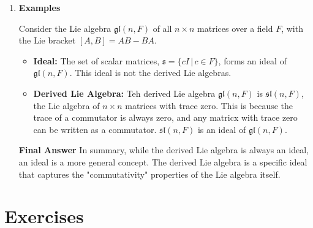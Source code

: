 \documentclass[12pt,a4paper]{report}
\begin{document}
\begin{remark}
\begin{enumerate}[label=Step \arabic*:]
	\item \textbf{Examples}
	
	Consider the Lie algebra $\mathfrak{gl}(n,F)$ of all $n \times n$ matrices over a field $F$, with the Lie bracket $[A,B]=AB-BA$.
	\begin{itemize}
		\item \textbf{Ideal: }The set of scalar matrices, $\mathfrak{s}=\{cI\,|\, c\in F\}$, forms an ideal of $\mathfrak{gl}(n,F)$.  This ideal is not the derived Lie algebras.
		\item \textbf{Derived Lie Algebra:} Teh derived Lie algebra $\mathfrak{gl}(n,F)$ is $\mathfrak{sl}(n,F)$, the Lie algebra of $n\times n$ matrices with trace zero.  This is because the trace of a commutator is always zero, and any matricx with trace zero can be written as a commutator.  $\mathfrak{sl}(n,F)$ is an ideal of $\mathfrak{gl}(n,F)$.
	\end{itemize}
	
	\textbf{Final Answer}  In summary, while the derived Lie algebra is always an ideal, an ideal is a more general concept. The derived Lie algebra is a specific ideal that captures the "commutativity" properties of the Lie algebra itself.

\end{enumerate}

\end{remark}
\section{Exercises}
\end{document}
